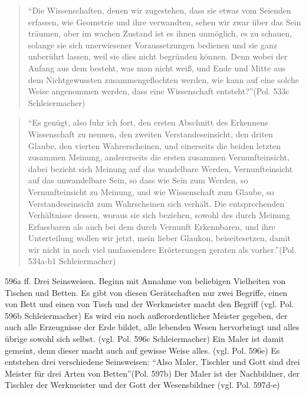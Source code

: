 \documentclass[12pt]{article}
\newcommand*{\zitatblock}[1]{%
    \begin{quote}
    \fontsize{10}{12}\selectfont
    \setlength{\parskip}{1.0em}
    #1
    \end{quote}
}
\begin{document}
\zitatblock{\enquote{Die Wissenschaften, denen wir zugestehen, dass sie etwas vom Seienden erfassen, wie Geometrie und ihre verwandten, sehen wir zwar über das Sein träumen, aber im wachen Zustand ist es ihnen unmöglich, es zu schauen, solange sie sich unerwiesener Voraussetzungen bedienen und sie ganz unberührt lassen, weil sie dies nicht begründen können. Denn wobei der Anfang aus dem besteht, was man nicht weiß, und Ende und Mitte aus dem Nichtgewussten zusammengeflochten werden, wie kann auf eine solche Weise angenommen werden, dass eine Wissenschaft entsteht?}(Pol. 533c Schleiermacher)}
\zitatblock{\enquote{Es genügt, also fuhr ich fort, den ersten Abschnitt des Erkennens Wissenschaft zu nennen, den zweiten Verstandeseinsicht, den driten Glaube, den vierten Wahrerscheinen, und einerseits die beiden letzten zusammen Meinung, andererseits die ersten zusammen Vernunfteinsicht, dabei bezieht sich Meinung auf das wandelbare Werden, Vernunfteinsicht auf das unwandelbare Sein, so dass wie Sein zum Werden, so Vernunfteinsicht zu Meinung, und wie Wissenschaft zum Glaube, so Verstandeseinsicht zum Wahrscheinen sich verhält. Die entsprechenden Verhältnisse dessen, woraus sie sich beziehen, sowohl des durch Meinung Erfassbaren als auch bei dem durch Vernunft Erkennbaren, und ihre Unterteilung wollen wir jetzt, mein lieber Glaukon, beiseitesetzen, damit wir nicht in noch viel umfassendere Erörterungen geraten als vorher.}(Pol. 534a-b1 Schleiermacher)}
596a ff. Drei Seinsweisen.
Beginn mit Annahme von beliebigen Vielheiten von Tischen und Betten. Es gibt von diesen Gerätschaften nur zwei Begriffe, einen von Bett und einen von Tisch und der Werkmeister macht den Begriff (vgl. Pol. 596b Schleiermacher)
Es wird ein noch außerordentlicher Meister gegeben, der auch alle Erzeugnisse der Erde bildet, alle lebenden Wesen hervorbringt und alles übrige sowohl sich selbst. (vgl. Pol. 596c Schleiermacher)
Ein Maler ist damit gemeint, denn dieser macht auch auf gewisse Weise alles. (vgl. Pol. 596e)
Es entstehen drei verschiedene Seinsweisen: \enquote{Also Maler, Tischler und Gott sind drei Meister für drei Arten von Betten}(Pol. 597b)
Der Maler ist der Nachbildner, der Tischler der Werkmeister und der Gott der Wesensbildner (vgl. Pol. 597d-e)
\end{document}

